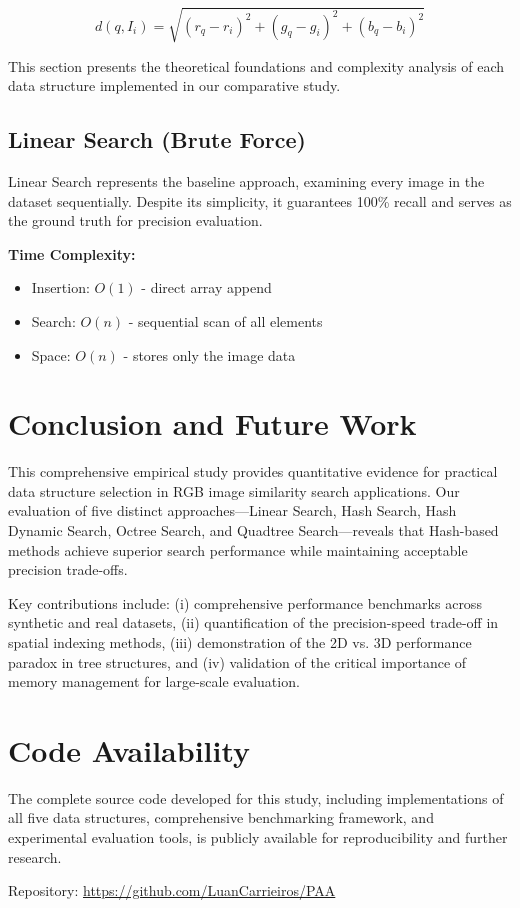 \documentclass{sbc2023}
\begin{document}
\begin{equation}
d(q, I_i) = \sqrt{(r_q - r_i)^2 + (g_q - g_i)^2 + (b_q - b_i)^2}
\label{eq:euclidean_distance}
\end{equation}

This section presents the theoretical foundations and complexity analysis of each data structure implemented in our comparative study.

\subsection{Linear Search (Brute Force)}

Linear Search represents the baseline approach, examining every image in the dataset sequentially. Despite its simplicity, it guarantees 100\% recall and serves as the ground truth for precision evaluation.

\textbf{Time Complexity:}
\begin{itemize}
    \item Insertion: $O(1)$ - direct array append
    \item Search: $O(n)$ - sequential scan of all elements
    \item Space: $O(n)$ - stores only the image data
\end{itemize}


\section{Conclusion and Future Work}
\label{sec:conclusion}

This comprehensive empirical study provides quantitative evidence for practical data structure selection in RGB image similarity search applications. Our evaluation of five distinct approaches—Linear Search, Hash Search, Hash Dynamic Search, Octree Search, and Quadtree Search—reveals that Hash-based methods achieve superior search performance while maintaining acceptable precision trade-offs.

Key contributions include: (i) comprehensive performance benchmarks across synthetic and real datasets, (ii) quantification of the precision-speed trade-off in spatial indexing methods, (iii) demonstration of the 2D vs. 3D performance paradox in tree structures, and (iv) validation of the critical importance of memory management for large-scale evaluation.

\section*{Code Availability}
\label{sec:code_availability}

The complete source code developed for this study, including implementations of all five data structures, comprehensive benchmarking framework, and experimental evaluation tools, is publicly available for reproducibility and further research.

Repository: \url{https://github.com/LuanCarrieiros/PAA}



\end{document}
